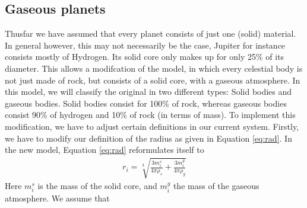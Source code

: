 \subsection{Gaseous planets}
Thusfar we have assumed that every planet consists of just one (solid) material. 
In general however, this may not necessarily be the case, Jupiter for instance consists mostly of Hydrogen. Its solid core only makes up for only 25\% of its diameter.
This allows a modifcation of the model, in which every celestial body is not just made of rock, but consists of a solid core, with a gaseous atmosphere. 
In this model, we will classify the original in two different types: Solid bodies and gaseous bodies.
 Solid bodies consist for 100\% of rock, whereas gaseous bodies consist 90\% of hydrogen and 10\% of rock (in terms of mass). To implement this modification, we have to adjust certain definitions in our current system. Firstly, we have to modify our definition of the radius as given in Equation \eqref{eq:rad}. In the new model, Equation \eqref{eq:rad} reformulates itself to
 \begin{align*}
 r_i=\sqrt[3]{\frac{3 m_i^s}{4\pi \rho_s}+\frac{3 m_i^g}{4\pi \rho_g}}
 \end{align*}
 Here \(m_i^s\) is the mass of the solid core, and \(m_i^g\) the mass of the gaseous atmosphere. We assume that 